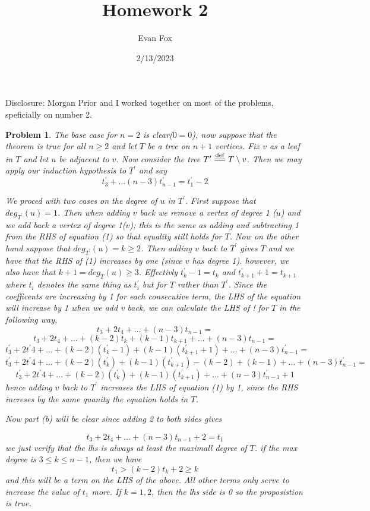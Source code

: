 \documentclass{article}
\title{Homework 2}
\author{Evan Fox}
\date{2/13/2023}
\newcommand{\defeq}{\overset{\mathrm{def}}{=\joinrel=}}
\newtheorem{prb}{Problem}
\begin{document}
 
\maketitle
Disclosure: Morgan Prior and I worked together on most of the problems, speficially on number 2. 
\begin{prb} 
	The base case for $n=2$ is clear($ 0 = 0$), now suppose that the theorem is true for all $n \geq 2$ and let $T$ be a tree on $n+1$ vertices. 
	Fix $v$ as a leaf in $T$ and let $u$ be adjacent to $v$. Now consider the tree $T^\prime \defeq T \setminus v$. 
	Then we may apply our induction hypothesis to $T^\prime$ and say 
	\begin{equation} 
	t^\prime_3 + \dots (n-3)t^\prime_{n-1} = t^\prime_1 -2
	\end{equation} 

	We proced with two cases on the degree of $u$ in $T^\prime$. First suppose that $deg_{T^\prime}(u) = 1$. Then when adding $v$ back we remove a 
	vertex of degree 1 ($u$) and we add back a vertex of degree 1($v$); this is the same as adding and subtracting 1 from the RHS of equation (1) so that equality still holds for $T$. Now on the other hand suppose that $deg_{T^\prime}(u) = k \geq 2$. 
	Then adding $v$ back to $T^\prime$ gives $T$ and we have that the RHS of (1) increases by one (since $v$ has degree 1). 
	however, we also have that $k + 1 = deg_{T}(u) \geq 3$. Effectivly $t_k^\prime - 1 = t_{k}$ and $t_{k+1}^\prime + 1 = t_{k+1}$ where 
	$t_i$ denotes the same thing as $t_i^\prime$ but for $T$ rather than $T^\prime$. Since the coefficents are increasing by 1 for each consecutive 
	term, the LHS of the equation will increase by 1 when we add v back, we can calculate the LHS of ! for $T$ in the following way,  
	\[t_3 + 2t_4 + \dots + (n-3)t_{n-1}=  \] 
	\[t_3 + 2t_4 + \dots + (k-2)t_k + (k-1)t_{k+1} + \dots + (n-3)t_{n-1} =  \] 
	\[t^\prime_3 + 2t^\prime4 + \dots + (k-2)(t^\prime_k - 1) + (k-1)(t^\prime_{k+1} +1) +  \dots + (n-3)t^\prime_{n-1} =  \] 
	\[t^\prime_3 + 2t^\prime4 + \dots + (k-2)(t^\prime_k)  + (k-1)(t^\prime_{k+1})- (k - 2) + (k - 1) + \dots + (n-3)t^\prime_{n-1}  =  \] 
	\[t^\prime_3 + 2t^\prime4 + \dots + (k-2)(t^\prime_k)  + (k-1)(t^\prime_{k+1}) + \dots + (n-3)t^\prime_{n-1} +1  \] 
	hence adding $v$ back to $T^\prime$ increases the LHS of equation (1) by 1, since the RHS increses by the same quanity the equation 
	holds in $T$. 


	Now part (b) will be clear since adding 2 to both sides gives  

	\[t_3 + 2t_4 + \dots + (n-3)t_{n-1} + 2= t_1  \] 
	we just verify that the lhs is always at least the maximall degree of $T$. 
	if the max degree is $3  \leq k \leq n-1$, then we have 
	\[ t_1 > (k - 2)t_k + 2 \geq k \] 
	and this will be a term on the LHS of the above. All other terms only serve to increase the value of $t_1$ more. 
	If $k = 1,2$, then the lhs side is 0 so the proposistion is true. 
\end{prb}
\end{document}
